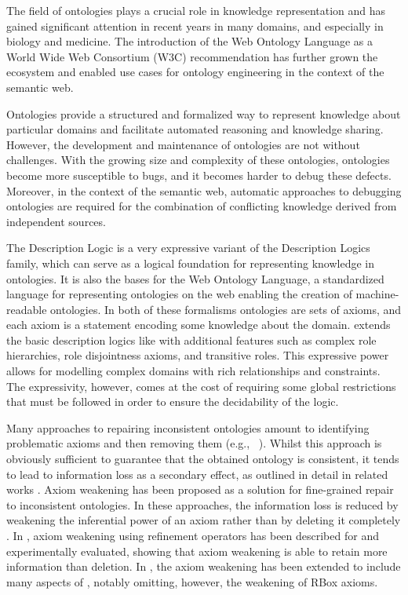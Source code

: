 
The field of ontologies plays a crucial role in knowledge representation and has gained significant attention in recent years in many domains, and especially in biology and medicine. The introduction of the Web Ontology Language as a World Wide Web Consortium (W3C) recommendation has further grown the ecosystem and enabled use cases for ontology engineering in the context of the semantic web.

Ontologies provide a structured and formalized way to represent knowledge about particular domains and facilitate automated reasoning and knowledge sharing. However, the development and maintenance of ontologies are not without challenges. With the growing size and complexity of these ontologies, ontologies become more susceptible to bugs, and it becomes harder to debug these defects. Moreover, in the context of the semantic web, automatic approaches to debugging ontologies are required for the combination of conflicting knowledge derived from independent sources.

The \SROIQ Description Logic is a very expressive variant of the Description Logics family, which can serve as a logical foundation for representing knowledge in ontologies. It is also the bases for the Web Ontology Language, a standardized language for representing ontologies on the web enabling the creation of machine-readable ontologies. In both of these formalisms ontologies are sets of axioms, and each axiom is a statement encoding some knowledge about the domain. \SROIQ extends the basic description logics like \ALC with additional features such as complex role hierarchies, role disjointness axioms, and transitive roles. This expressive power allows for modelling complex domains with rich relationships and constraints. The expressivity, however, comes at the cost of requiring some global restrictions that must be followed in order to ensure the decidability of the logic.

Many approaches to repairing inconsistent ontologies amount to identifying problematic axioms and then removing them (e.g., ~\cite{schlobach2003non,kalyanpur2005debugging,kalyanpur2006repairing,BaPS07}). Whilst this approach is obviously sufficient to guarantee that the obtained ontology is consistent, it tends to lead to information loss as a secondary effect, as outlined in detail in related works \cite{troquard2018repairing,confalonieri2020towards}. 
Axiom weakening has been proposed as a solution for fine-grained repair to inconsistent ontologies. In these approaches, the information loss is reduced by weakening the inferential power of an axiom rather than by deleting it completely \cite{du2014practical,AMAI-2018,baader2018making,troquard2018repairing,confalonieri2020towards}. 
%
In \cite{troquard2018repairing}, axiom weakening using refinement operators has been described for \ALC and experimentally evaluated, showing that axiom weakening is able to retain more information than deletion. In \cite{confalonieri2020towards}, the axiom weakening has been extended to include many aspects of \SROIQ, notably omitting, however, the weakening of RBox axioms.

